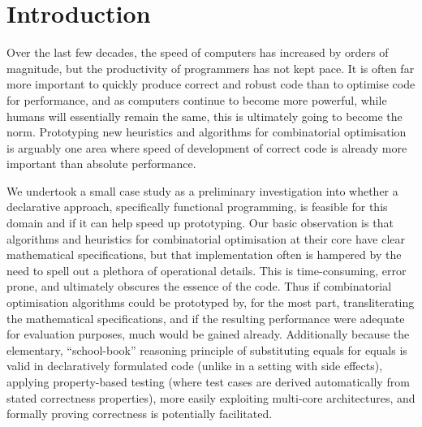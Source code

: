 \section{Introduction}

Over the last few decades, the speed of computers has increased by orders of
magnitude, but the productivity of programmers has not kept pace. It is often far more
important to quickly produce correct and robust code than to optimise code for
performance, and as computers continue to become more powerful, while humans
will essentially remain the same, this is ultimately going to become the norm.
Prototyping new heuristics and algorithms for combinatorial optimisation is
arguably one area where speed of development of correct code is already more
important than absolute performance.

We undertook a small case study as a preliminary investigation
into whether a declarative approach, specifically functional programming, is
feasible for this domain and if it can help speed up prototyping. Our
basic observation is that algorithms and heuristics for combinatorial
optimisation at their core have clear mathematical specifications, but that
implementation often is hampered by the need to spell out a plethora of
operational details. This is time-consuming, error prone, and ultimately
obscures the essence of the code. Thus if combinatorial optimisation
algorithms could be prototyped by, for the most part, transliterating the
mathematical specifications, and if the resulting performance were adequate
for evaluation purposes, much would be gained already.
Additionally because the elementary, ``school-book'' reasoning principle of
substituting equals for equals is valid in declaratively formulated code
(unlike in a setting with side effects), applying property-based testing
\cite{quickcheck} (where test cases are derived automatically from stated
correctness properties), more easily exploiting multi-core architectures, and formally proving correctness is potentially facilitated.


